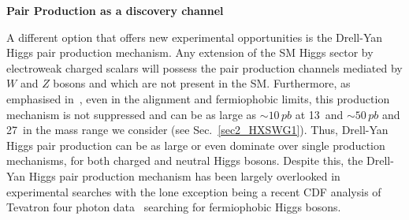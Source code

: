 \documentclass[../report.tex]{subfiles}
\begin{document}
{\bf{Pair Production as a discovery channel}}\label{sec:pair}

A different option that offers new experimental opportunities is
  the Drell-Yan Higgs pair production mechanism. Any extension of the SM Higgs sector by electroweak charged scalars will possess the pair production channels mediated by $W$ and $Z$ bosons and which are not present in the SM. Furthermore, as emphasised in~\cite{Akeroyd:2003bt,Akeroyd:2003xi,Akeroyd:2003jp,Ilisie:2014hea,Delgado:2016arn,Vega:2018ddp}, even in the alignment and fermiophobic limits, this production mechanism is not suppressed and can be as large as $\sim 10\,pb$ at 13~\UTeV and $\sim 50\,pb$ and 27~\UTeV in the mass range we consider (see Sec.~\ref{sec2_HXSWG1}). Thus, Drell-Yan Higgs pair production can be as large or even dominate over single  production mechanisms, for both charged and neutral Higgs bosons. Despite this, the Drell-Yan Higgs pair production mechanism has been largely overlooked in experimental searches with the lone exception being a recent CDF analysis of Tevatron four photon data~\cite{Aaltonen:2016fnw} searching for fermiophobic Higgs bosons.  
\end{document}
